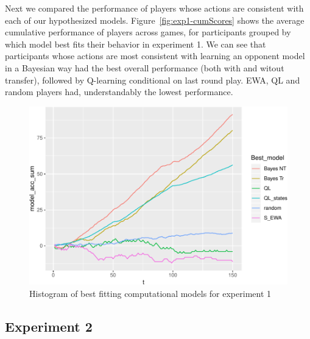 \documentclass[man,floatsintext]{apa6}
\begin{document}
Next we compared the performance of players whose actions are consistent with each of our hypothesized models. Figure~\ref{fig:exp1-cumScores} shows the average cumulative performance of players across games, for participants grouped by which model best fits their behavior in experiment 1. We can see that participants whose actions are most consistent with learning an opponent model in a Bayesian way had the best overall performance (both with and witout transfer), followed by Q-learning conditional on last round play. EWA, QL and random players had, understandably the lowest performance.

\begin{figure}

{\centering \includegraphics{draft_report_v1_files/figure-latex/exp1-comp-model-1} 

}

\caption{Histogram of best fitting computational models for experiment 1}\label{fig:exp1-comp-model}
\end{figure}

\hypertarget{experiment-2}{%
\subsection{Experiment 2}\label{experiment-2}}
\end{document}
